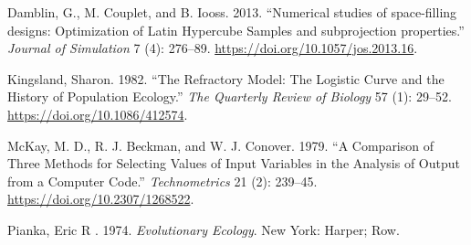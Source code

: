 \documentclass[
]{book}
\newlength{\cslhangindent}
\newenvironment{cslreferences}%
  {\setlength{\parindent}{0pt}%
  \everypar{\setlength{\hangindent}{\cslhangindent}}\ignorespaces}%
  {\par}
\begin{document}
\hypertarget{refs}{}
\begin{cslreferences}
\leavevmode\hypertarget{ref-Damblin2013}{}%
Damblin, G., M. Couplet, and B. Iooss. 2013. ``Numerical studies of space-filling designs: Optimization of Latin Hypercube Samples and subprojection properties.'' \emph{Journal of Simulation} 7 (4): 276--89. \url{https://doi.org/10.1057/jos.2013.16}.

\leavevmode\hypertarget{ref-Kingsland1982}{}%
Kingsland, Sharon. 1982. ``The Refractory Model: The Logistic Curve and the History of Population Ecology.'' \emph{The Quarterly Review of Biology} 57 (1): 29--52. \url{https://doi.org/10.1086/412574}.

\leavevmode\hypertarget{ref-McKay1979a}{}%
McKay, M. D., R. J. Beckman, and W. J. Conover. 1979. ``A Comparison of Three Methods for Selecting Values of Input Variables in the Analysis of Output from a Computer Code.'' \emph{Technometrics} 21 (2): 239--45. \url{https://doi.org/10.2307/1268522}.

\leavevmode\hypertarget{ref-Pianka1974}{}%
Pianka, Eric R . 1974. \emph{Evolutionary Ecology}. New York: Harper; Row.
\end{cslreferences}
\end{document}
